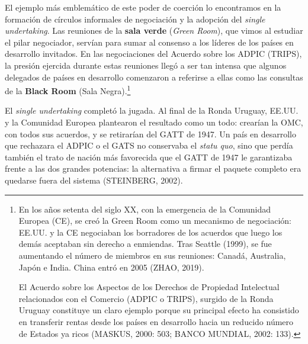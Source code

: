 \documentclass[10pt,a4paper]{article}
\begin{document}
El ejemplo más emblemático de este poder de coerción lo encontramos en la formación de círculos informales de negociación y la adopción del \textit{single undertaking}. Las reuniones de la \textbf{sala verde} (\textit{Green Room}), que vimos al estudiar el pilar negociador, servían para sumar al consenso a los líderes de los países en desarrollo invitados. En las negociaciones del Acuerdo sobre los ADPIC (TRIPS), la presión ejercida durante estas reuniones llegó a ser tan intensa que algunos delegados de países en desarrollo comenzaron a referirse a ellas como las consultas de la \textbf{Black Room} (Sala Negra).\footnote{%
    En los años setenta del siglo XX, con la emergencia de la Comunidad Europea (CE), se creó la Green Room como un mecanismo de negociación: EE.UU. y la CE negociaban los borradores de los acuerdos que luego los demás aceptaban sin derecho a enmiendas. Tras Seattle (1999), se fue aumentando el número de miembros en sus reuniones: Canadá, Australia, Japón e India. China entró en 2005 (ZHAO, 2019).

El Acuerdo sobre los Aspectos de los Derechos de Propiedad Intelectual relacionados con el Comercio (ADPIC o TRIPS), surgido de la Ronda Uruguay constituye un claro ejemplo porque su principal efecto ha consistido en transferir rentas desde los países en desarrollo hacia un reducido número de Estados ya ricos (MASKUS, 2000: 503; BANCO MUNDIAL, 2002: 133).
}

El \textit{single undertaking} completó la jugada. Al final de la Ronda Uruguay, EE.UU. y la Comunidad Europea plantearon el resultado como un todo: crearían la OMC, con todos sus acuerdos, y se retirarían del GATT de 1947. Un país en desarrollo que rechazara el ADPIC o el GATS no conservaba el \textit{statu quo}, sino que perdía también el trato de nación más favorecida que el GATT de 1947 le garantizaba frente a las dos grandes potencias: la alternativa a firmar el paquete completo era quedarse fuera del sistema (STEINBERG, 2002).
\end{document}
